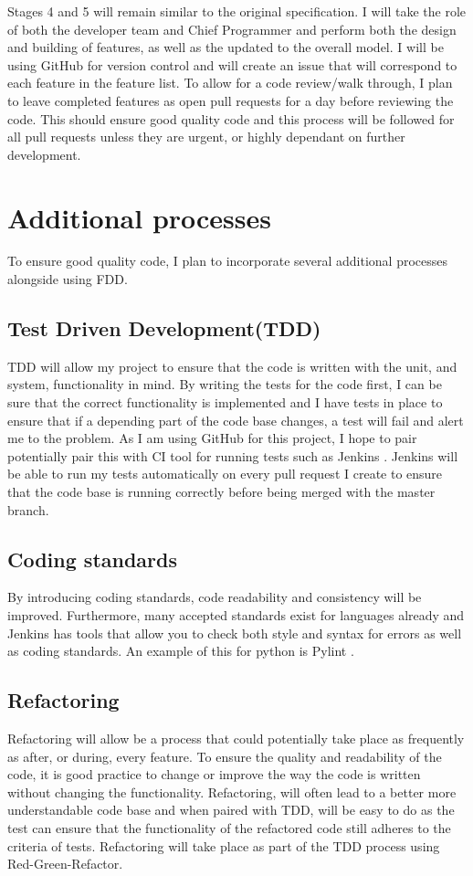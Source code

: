 \documentclass{article}
\begin{document}
Stages 4 and 5  will remain similar to the original specification. I will take the role of both the developer team and Chief Programmer and perform both the design and building of features, as well as the updated to the overall model. I will be using GitHub for version control and will create an issue that will correspond to each feature in the feature list. To allow for a code review/walk through, I plan to leave completed features as open pull requests for a day before reviewing the code. This should ensure good quality code and this process will be followed for all pull requests unless they are urgent, or highly dependant on further development.

\section{Additional processes}
To ensure good quality code, I plan to incorporate several additional processes alongside using FDD.

\subsection{Test Driven Development(TDD)}
TDD will allow my project to ensure that the code is written with the unit, and system, functionality in mind. By writing the tests for the code first, I can be sure that the correct functionality is implemented and I have tests in place to ensure that if a depending part of the code base changes, a test will fail and alert me to the problem. As I am using GitHub for this project, I hope to pair potentially pair this with CI tool for running tests such as Jenkins \cite{jenkins}. Jenkins will be able to run my tests automatically on every pull request I create to ensure that the code base is running correctly before being merged with the master branch.

\subsection{Coding standards}
By introducing coding standards, code readability and consistency will be improved. Furthermore, many accepted standards exist for languages already and Jenkins has tools that allow you to check both style and syntax for errors as well as coding standards. An example of this for python is Pylint \cite{pylint}.

\subsection{Refactoring}
Refactoring will allow be a process that could potentially take place as frequently as after, or during, every feature. To ensure the quality and readability of the code, it is good practice to change or improve the way the code is written without changing the functionality. Refactoring, will often lead to a better more understandable code base and when paired with TDD, will be easy to do as the test can ensure that the functionality of the refactored code still adheres to the criteria of tests. Refactoring will take place as part of the TDD process using Red-Green-Refactor.
\end{document}
